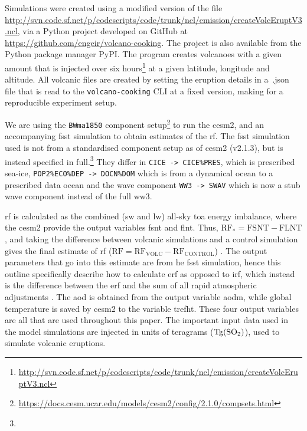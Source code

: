 \documentclass{ametsocV6.1}
\newcommand{\iso}[1][i]{{#1}njected \ce{SO2}}
\begin{document}


\appendix

\appendix[A]


Simulations were created using a modified version of the file
\url{http://svn.code.sf.net/p/codescripts/code/trunk/ncl/emission/createVolcEruptV3.ncl},
via a Python project developed on GitHub at
\url{https://github.com/engeir/volcano-cooking}. The project is also available from the
Python package manager PyPI\@. The program creates volcanoes with a given 
amount that is injected over six
hours\footnote{\url{http://svn.code.sf.net/p/codescripts/code/trunk/ncl/emission/createVolcEruptV3.ncl}}
at a given latitude, longitude and altitude. All volcanic  files are created by
setting the eruption details in a~.json file that is read to the
\texttt{volcano-cooking} CLI at a fixed version, making for a reproducible experiment
setup.

We are using the \texttt{BWma1850} component
setup\footnote{\url{https://docs.cesm.ucar.edu/models/cesm2/config/2.1.0/compsets.html}}
to run the \gls{cesm2}, and an accompanying \gls{fsst} simulation to obtain estimates of
the \gls{rf}. The \gls{fsst} simulation used is not from a standardised component setup
as of \gls{cesm2} (v2.1.3), but is instead specified in full.\footnote{\fssturl} They
differ in \texttt{CICE -> CICE\%PRES}, which is prescribed sea-ice,
\texttt{POP2\%ECO\%DEP -> DOCN\%DOM} which is from a dynamical ocean to a prescribed
data ocean and the wave component \texttt{WW3 -> SWAV} which is now a stub wave
component instead of the full \gls{ww3}.

\gls{rf} is calculated as the combined (\gls{sw} and \gls{lw}) all-sky \gls{toa} energy
imbalance, where the \gls{cesm2} provide the output variables \gls{fsnt} and \gls{flnt}.
Thus, \(\mathrm{RF_*}= \mathrm{FSNT} - \mathrm{FLNT}\), and taking the difference
between volcanic simulations and a control simulation gives the final estimate of
\gls{rf} (\(\mathrm{RF}=\mathrm{RF_{VOLC}}-\mathrm{RF_{CONTROL}}\))
\citep{marshall2020}. The output parameters that go into this estimate are from he
\gls{fsst} simulation, hence this outline specifically describe how to calculate
\gls{erf} as opposed to \gls{irf}, which instead is the difference between the \gls{erf}
and the sum of all rapid atmospheric adjustments \citep{marshall2020,smith2018}. The
\gls{aod} is obtained from the output variable \gls{aodm}, while global temperature is
saved by \gls{cesm2} to the variable \gls{trefht}. These four output variables are all
that are used throughout this paper. The important input data used in the model
simulations are \iso{} in units of teragrams (\(\si{\tera\gram(\ce{SO2})}\)), used to
simulate volcanic eruptions.
\end{document}
